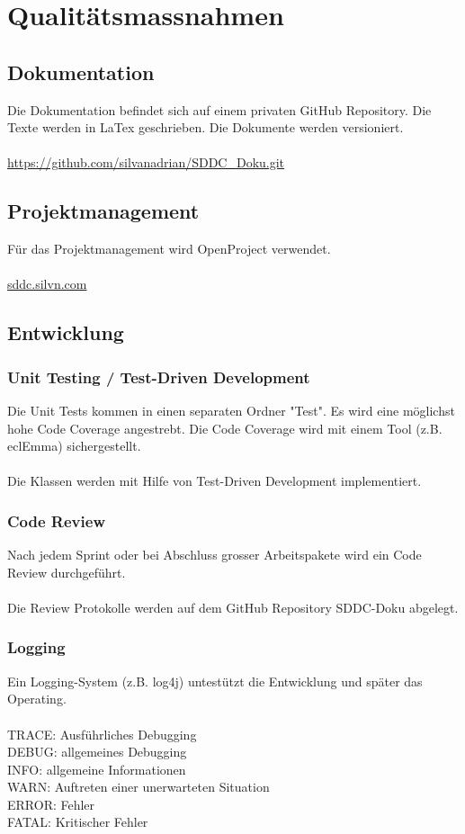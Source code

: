 \documentclass[11pt]{scrartcl}
\begin{document}
\section{Qualitätsmassnahmen}
\subsection{Dokumentation}
Die Dokumentation befindet sich auf einem privaten GitHub Repository.
Die Texte werden in LaTex geschrieben. Die Dokumente werden versioniert.\\
\\
\url{https://github.com/silvanadrian/SDDC_Doku.git}

\subsection{Projektmanagement}
Für das Projektmanagement wird OpenProject verwendet.\\
\\
\url{sddc.silvn.com}


\subsection{Entwicklung}
\subsubsection{Unit Testing / Test-Driven Development}
Die Unit Tests kommen in einen separaten Ordner "Test".
Es wird eine möglichst hohe Code Coverage angestrebt.
Die Code Coverage wird mit einem Tool (z.B. eclEmma) sichergestellt.\\
\\
Die Klassen werden mit Hilfe von Test-Driven Development implementiert.

\subsubsection{Code Review}
Nach jedem Sprint oder bei Abschluss grosser Arbeitspakete wird ein Code Review durchgeführt.\\
\\
Die Review Protokolle werden auf dem GitHub Repository SDDC-Doku abgelegt.

\subsubsection{Logging}
Ein Logging-System (z.B. log4j) untestützt die Entwicklung und später das Operating.\\
\\
TRACE: Ausführliches Debugging\\
DEBUG: allgemeines Debugging\\
INFO: allgemeine Informationen\\
WARN: Auftreten einer unerwarteten Situation\\
ERROR: Fehler\\
FATAL: Kritischer Fehler\\
\\
\end{document}
